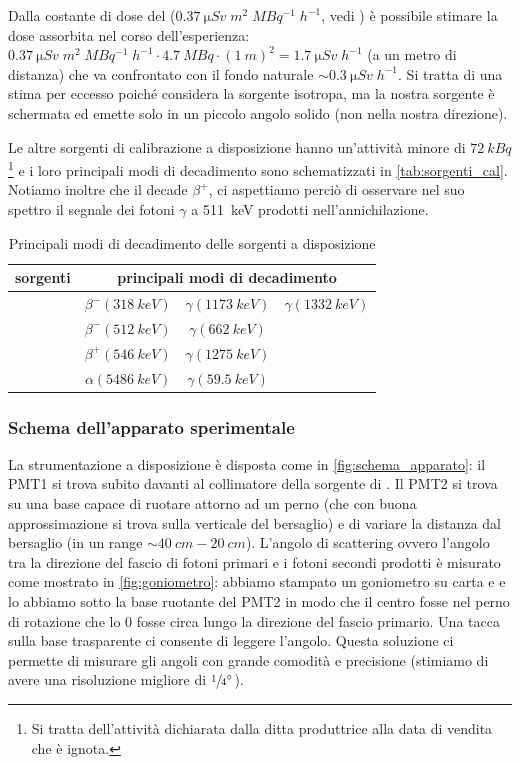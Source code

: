 Dalla costante di dose del \co\;  ($\SI{0.37}{\micro Sv\;m^2\;MBq^{-1}\;h^{-1}}$, vedi \cite{1}) è possibile stimare la dose assorbita nel corso dell'esperienza: $\SI{0.37}{\micro Sv\;m^2\;MBq^{-1}\;h^{-1}} \cdot \SI{4.7}{MBq} \cdot (\SI{1}{m})^2= \SI{1.7}{\micro Sv\;h^{-1}}$ (a un metro di distanza) che va confrontato con il fondo naturale $\sim\SI{0.3}{\micro Sv\;h^{-1}}$. Si tratta di una stima per eccesso poiché considera la sorgente isotropa, ma la nostra sorgente è schermata ed emette solo in un piccolo angolo solido (non nella nostra direzione).

Le altre sorgenti di calibrazione a disposizione hanno un'attività minore di $\SI{72}{kBq}$\footnote{Si tratta dell'attività dichiarata dalla ditta produttrice alla data di vendita che è ignota.} e i loro principali modi di decadimento sono schematizzati in \autoref{tab:sorgenti_cal}. Notiamo inoltre che il \na\; decade $\beta^+$, ci aspettiamo perciò di osservare nel suo spettro il segnale dei fotoni $\gamma$ a \SI{511}{keV} prodotti nell'annichilazione.

\begin{table}[h]
	\centering
	\begin{tabular}{cccc}
		\toprule
		sorgenti & \multicolumn{3}{c}{principali modi di decadimento} \\
		\midrule
		\co & $\beta^{-} (\SI{318}{keV})$ & $\gamma (\SI{1173}{keV})$ & $\gamma (\SI{1332}{keV})$  \\
		\cs & $\beta^{-} (\SI{512}{keV})$ & $\gamma (\SI{662}{keV})$ \\
		\na & $\beta^{+} (\SI{546}{keV})$ & $\gamma (\SI{1275}{keV})$ \\
		\am & $\alpha (\SI{5486}{keV})$ & $\gamma (\SI{59.5}{keV})$ \\
		\bottomrule
	\end{tabular}
	\caption{\label{tab:sorgenti_cal} Principali modi di decadimento delle sorgenti a disposizione \cite{2}}
\end{table} 

\subsubsection{Schema dell'apparato sperimentale}
La strumentazione a disposizione è disposta come in \autoref{fig:schema_apparato}: il PMT1 si trova subito davanti al collimatore della sorgente di \co. Il PMT2 si trova su una base capace di ruotare attorno ad un perno (che con buona approssimazione si trova sulla verticale del bersaglio) e di variare la distanza dal bersaglio (in un range $\sim\SI{40}{cm}-\SI{20}{cm}$).
L'angolo di scattering ovvero l'angolo tra la direzione del fascio di fotoni primari e i fotoni secondi prodotti è misurato come mostrato in \autoref{fig:goniometro}: abbiamo stampato un goniometro su carta e e lo abbiamo sotto la base ruotante del PMT2 in modo che il centro fosse nel perno di rotazione che lo 0 fosse circa lungo la direzione del fascio primario. Una tacca sulla base trasparente ci consente di leggere l'angolo. Questa soluzione ci permette di misurare gli angoli con grande comodità e precisione (stimiamo di avere una risoluzione migliore di $\sfrac14 \si{\degree}$).

